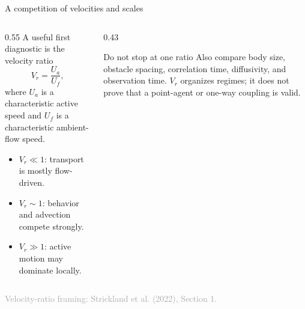 \documentclass[aspectratio=169,11pt]{beamer}
\newcommand{\sourcecredit}[1]{\vfill\hfill{\tiny\textcolor{DarkGray}{#1}}}
\begin{document}
\begin{frame}{A competition of velocities and scales}
\begin{columns}[T,onlytextwidth]
  \begin{column}{0.55\textwidth}
    A useful first diagnostic is the velocity ratio
    \[
      V_r=\frac{U_a}{U_f},
    \]
    where $U_a$ is a characteristic active speed and $U_f$ is a characteristic ambient-flow speed.
    \begin{itemize}
      \item $V_r\ll1$: transport is mostly flow-driven.
      \item $V_r\sim1$: behavior and advection compete strongly.
      \item $V_r\gg1$: active motion may dominate locally.
    \end{itemize}
  \end{column}
  \begin{column}{0.43\textwidth}
    \begin{block}{Do not stop at one ratio}
      Also compare body size, obstacle spacing, correlation time, diffusivity, and observation time. $V_r$ organizes regimes; it does not prove that a point-agent or one-way coupling is valid.
    \end{block}
  \end{column}
\end{columns}
\sourcecredit{Velocity-ratio framing: Strickland et al. (2022), Section 1.}
\end{frame}
\end{document}
